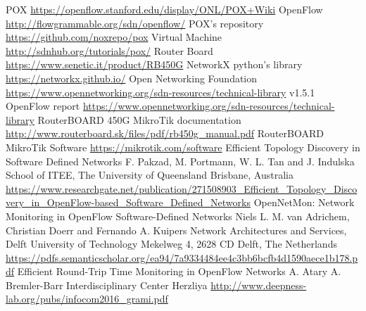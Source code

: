 \documentclass[conference,10pt]{IEEEtran}
\begin{document}
\begin{thebibliography}{99}
	 POX \url{https://openflow.stanford.edu/display/ONL/POX+Wiki}
	 OpenFlow \url{http://flowgrammable.org/sdn/openflow/}
	 POX's repository \url{https://github.com/noxrepo/pox}
	 Virtual Machine \url{http://sdnhub.org/tutorials/pox/}
	 Router Board \url{https://www.senetic.it/product/RB450G}
	 NetworkX python's library \url{https://networkx.github.io/}
	 Open Networking Foundation \url{https://www.opennetworking.org/sdn-resources/technical-library}
	 v1.5.1 OpenFlow report \url{https://www.opennetworking.org/sdn-resources/technical-library}
	 RouterBOARD 450G MikroTik documentation \url{http://www.routerboard.sk/files/pdf/rb450g_manual.pdf}
	 RouterBOARD MikroTik Software \url{https://mikrotik.com/software}
	  Efficient Topology Discovery in Software Defined Networks F. Pakzad, M. Portmann, W. L. Tan and J. Indulska
	School of ITEE, The University of Queensland Brisbane, Australia \url{https://www.researchgate.net/publication/271508903_Efficient_Topology_Discovery_in_OpenFlow-based_Software_Defined_Networks}
	 OpenNetMon: Network Monitoring in OpenFlow Software-Defined Networks Niels L.
	M. van Adrichem, Christian Doerr and Fernando A. Kuipers Network Architectures and Services, Delft University of Technology
	Mekelweg 4, 2628 CD Delft, The Netherlands \url{https://pdfs.semanticscholar.org/ea94/7a9334484ee4c3bb6bcfb4d1590aece1b178.pdf}
	 Efficient Round-Trip Time Monitoring in OpenFlow Networks A. Atary A. Bremler-Barr Interdisciplinary Center Herzliya \url{http://www.deepness-lab.org/pubs/infocom2016_grami.pdf}


	\end{thebibliography}
\end{document}
